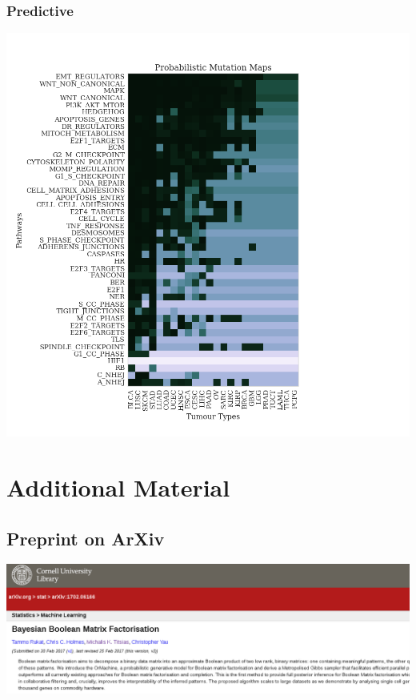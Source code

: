 \documentclass[11pt]{article}
\begin{document}
\subsubsection*{Predictive}
\label{sec-4-9-4}
\includegraphics[width=.9\linewidth]{./fa_pw_predictive.png}
\section*{Additional Material}
\label{sec-5}
\subsection*{Preprint on ArXiv}
\label{sec-5-1}
\includegraphics[width=.9\linewidth]{./arxiv.png}
\end{document}
